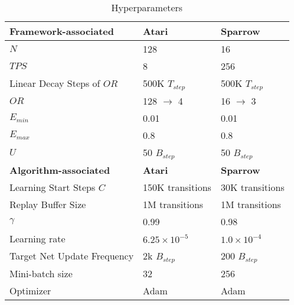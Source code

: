 \documentclass[journal]{IEEEtran}
\begin{document}
\begin{table}[htbp]
	\centering
	\caption{Hyperparameters}
	\begin{tabular}{lll}
		\hline
		\textbf{Framework-associated} & \textbf{Atari} & \textbf{Sparrow} \\
		\hline
		$N$ & 128 & 16 \\
		$TPS$ & 8 & 256 \\
		Linear Decay Steps of $OR$ & 500K $T_{step}$ & 500K $T_{step}$ \\
		$OR$ & 128 $\rightarrow$ 4 & 16 $\rightarrow$ 3 \\
		$E_{min}$ & 0.01 & 0.01 \\
		$E_{max}$ & 0.8 & 0.8 \\
		$U$ & 50 $B_{step}$ & 50 $B_{step}$ \\
		\hline
		\hline
		\textbf{Algorithm-associated} & \textbf{Atari} & \textbf{Sparrow} \\
		\hline
		Learning Start Steps $C$ & 150K transitions & 30K transitions\\
		Replay Buffer Size & 1M transitions & 1M transitions \\
		$\gamma$ & 0.99 & 0.98 \\
		Learning rate & $6.25 \times 10^{-5}$ & $1.0 \times 10^{-4}$ \\
		Target Net Update Frequency & 2k $B_{step}$ & 200 $B_{step}$ \\
		Mini-batch size & 32 & 256 \\
		Optimizer & Adam  & Adam \\
		\hline
	\end{tabular}\label{tab:hp}\end{table}




\newpage



	
\end{document}
